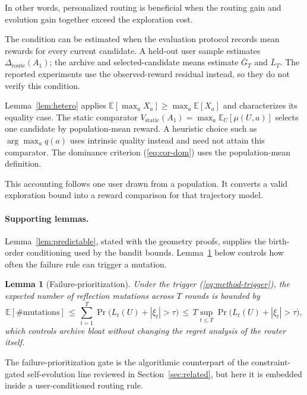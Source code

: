 \documentclass{article} %
\newtheorem{lemma}[theorem]{Lemma}
\providecommand{\E}{\mathbb{E}}
\renewcommand{\eqref}[1]{\textup{(\ref{#1})}}
\begin{document}
In other words, personalized routing is beneficial when the routing gain and evolution gain together exceed the exploration cost.

The condition can be estimated when the evaluation protocol records mean
rewards for every current candidate. A held-out user sample estimates
\(\Delta_{\mathrm{route}}(A_1)\); the archive and selected-candidate means
estimate \(\bar G_T\) and \(\bar L_T\). The reported experiments use the
observed-reward residual instead, so they do not verify this condition.

Lemma~\ref{lem:hetero} applies $\E[\max_a X_a]\ge\max_a\E[X_a]$ and characterizes its equality case. The static comparator $V_{\mathrm{static}}(A_1)=\max_a\E_U[\mu(U,a)]$ selects one candidate by population-mean reward. A heuristic choice such as $\arg\max_a q(a)$ uses intrinsic quality instead and need not attain this comparator. The dominance criterion \eqref{eq:cor-dom} uses the population-mean definition.

This accounting follows one user drawn from a population. It converts a
valid exploration bound into a reward comparison for that trajectory model.

\paragraph{Supporting lemmas.}

\label{sec:method-supporting}

Lemma~\ref{lem:predictable}, stated with the geometry proofs, supplies the
birth-order conditioning used by the bandit bounds.
Lemma~\ref{lem:failure} below controls how often the failure rule can trigger
a mutation.

\begin{lemma}[Failure-prioritization]
\label{lem:failure}
Under the trigger \eqref{eq:method-trigger}, the expected number of reflection mutations across $T$ rounds is bounded by
\begin{equation}
\label{eq:lem-failure}
\E[\#\mathrm{mutations}]
\,\le\,
\sum_{t=1}^{T}\Pr\bigl(L_t(U)+|\xi_t|>\tau\bigr)
\,\le\,
T\sup_{t\le T}\Pr\bigl(L_t(U)+|\xi_t|>\tau\bigr),
\end{equation}
which controls archive bloat without changing the regret analysis of the router itself.
\end{lemma}

The failure-prioritization gate is the algorithmic counterpart of the constraint-gated self-evolution line reviewed in Section~\ref{sec:related}, but here it is embedded inside a user-conditioned routing rule.
\end{document}
